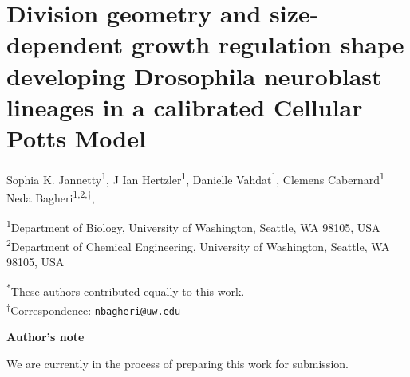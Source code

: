 \documentclass [11pt, oneside] {uwthesis}
\begin{document}
\textpages

\chapter{Division geometry and size-dependent growth regulation shape developing Drosophila neuroblast lineages in a calibrated Cellular Potts Model}

\vspace{-1em}

\begin{center}
\small
Sophia K. Jannetty\textsuperscript{1},
J Ian Hertzler\textsuperscript{1},
Danielle Vahdat\textsuperscript{1},
Clemens Cabernard\textsuperscript{1}
Neda Bagheri\textsuperscript{1,2,$\dagger$},

\vspace{0.75em}

\textsuperscript{1}Department of Biology, University of Washington, Seattle, WA 98105, USA\\
\textsuperscript{2}Department of Chemical Engineering, University of Washington, Seattle, WA 98105, USA\\

\vspace{0.75em}

\textsuperscript{*}These authors contributed equally to this work.\\
\textsuperscript{$\dagger$}Correspondence: \texttt{nbagheri@uw.edu}

\vspace{1em}
\normalsize
\textbf{Author's note}
\end{center}

We are currently in the process of preparing this work for submission.










\nocite{*}
\printbibliography
\end{document}
